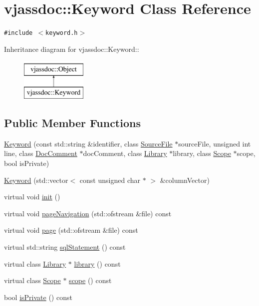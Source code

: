 \hypertarget{classvjassdoc_1_1Keyword}{
\section{vjassdoc::Keyword Class Reference}
\label{classvjassdoc_1_1Keyword}
}
{\tt \#include $<$keyword.h$>$}

Inheritance diagram for vjassdoc::Keyword::\begin{figure}[H]
\begin{center}
\leavevmode
\includegraphics[height=2cm]{classvjassdoc_1_1Keyword}
\end{center}
\end{figure}
\subsection*{Public Member Functions}
\begin{CompactItemize}
\item 
\hyperlink{classvjassdoc_1_1Keyword_f9216d9602f71a8b10d25d6c61412fc2}{Keyword} (const std::string \&identifier, class \hyperlink{classvjassdoc_1_1SourceFile}{SourceFile} $\ast$sourceFile, unsigned int line, class \hyperlink{classvjassdoc_1_1DocComment}{DocComment} $\ast$docComment, class \hyperlink{classvjassdoc_1_1Library}{Library} $\ast$library, class \hyperlink{classvjassdoc_1_1Scope}{Scope} $\ast$scope, bool isPrivate)
\item 
\hyperlink{classvjassdoc_1_1Keyword_b12dde7146b5bb943108d520599d988d}{Keyword} (std::vector$<$ const unsigned char $\ast$ $>$ \&columnVector)
\item 
virtual void \hyperlink{classvjassdoc_1_1Keyword_0aeec733c7c55ff51c8b1ba58af18ed9}{init} ()
\item 
virtual void \hyperlink{classvjassdoc_1_1Keyword_c8950d4ece99a58cc664daf5f652f37c}{pageNavigation} (std::ofstream \&file) const 
\item 
virtual void \hyperlink{classvjassdoc_1_1Keyword_207c989cefeeb0857adb76aa5d7bd842}{page} (std::ofstream \&file) const 
\item 
virtual std::string \hyperlink{classvjassdoc_1_1Keyword_b2d197337624e89955564ac684bfd5ad}{sqlStatement} () const 
\item 
virtual class \hyperlink{classvjassdoc_1_1Library}{Library} $\ast$ \hyperlink{classvjassdoc_1_1Keyword_9496b5c2a1eedee46d27dd166608b12f}{library} () const 
\item 
virtual class \hyperlink{classvjassdoc_1_1Scope}{Scope} $\ast$ \hyperlink{classvjassdoc_1_1Keyword_5524a7a3029192c2c460a1914cce63e3}{scope} () const 
\item 
bool \hyperlink{classvjassdoc_1_1Keyword_f07683a667bfdfaa4dfa82da6844af97}{isPrivate} () const 
\end{CompactItemize}


